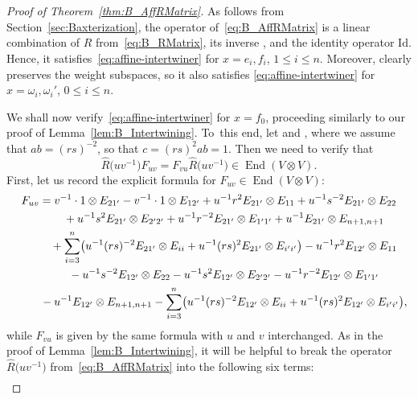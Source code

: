 \documentclass[10pt,a4paper]{amsart}
\numberwithin{equation}{section}
\DeclareMathOperator{\End}{End}
\newcommand{\Id}{\mathrm{Id}}
\begin{document}
\begin{proof}[Proof of Theorem~\ref{thm:B_AffRMatrix}]
As follows from Section~\ref{sec:Baxterization}, the operator  of~\eqref{eq:B_AffRMatrix} is a linear combination of $\hat{R}$ from~\eqref{eq:B_RMatrix}, its inverse , and the identity operator $\Id$. Hence, it satisfies~\eqref{eq:affine-intertwiner} for $x=e_i,f_i$, $1\leq i\leq n$. Moreover,  clearly preserves the weight subspaces, so it also satisfies \eqref{eq:affine-intertwiner} for $x = \omega_{i},\omega_{i}'$, $0 \le i \le n$.

We shall now verify~\eqref{eq:affine-intertwiner} for $x=f_0$, proceeding similarly to our proof of Lemma~\ref{lem:B_Intertwining}. To~this end, let  and , where we assume that $ab = (rs)^{-2}$, so that $c = (rs)^{2}ab = 1$. Then we need to verify that
\[
\hat{R}\bigl(uv^{-1}\bigr)F_{uv}= F_{vu}\hat{R}\bigl(uv^{-1}\bigr)\in \End(V \otimes V).
\]
First, let us record the explicit formula for $F_{uv}\in \End(V \otimes V)$:
\begin{gather*}
 F_{uv} = v^{-1} \cdot 1 \otimes E_{21'} - v^{-1}\cdot 1 \otimes E_{12'} + u^{-1}r^{2}E_{21'} \otimes E_{11} + u^{-1}s^{-2}E_{21'} \otimes E_{22} \\
 \hphantom{ F_{uv} =}{}
 + u^{-1}s^{2} E_{21'} \otimes E_{2'2'}+ u^{-1}r^{-2}E_{21'} \otimes E_{1'1'} + u^{-1}E_{21'} \otimes E_{n + 1,n + 1} \\
 \hphantom{ F_{uv} =}{}
+ \sum_{i = 3}^{n}\bigl(u^{-1}(rs)^{-2}E_{21'} \otimes E_{ii} + u^{-1}(rs)^{2}E_{21'} \otimes E_{i'i'}\bigr) - u^{-1}r^{2}E_{12'} \otimes E_{11} \\
 \hphantom{ F_{uv} =}{}
- u^{-1}s^{-2}E_{12'} \otimes E_{22} - u^{-1}s^{2}E_{12'} \otimes E_{2'2'} - u^{-1}r^{-2}E_{12'} \otimes E_{1'1'} \\
 \hphantom{ F_{uv} =}{}
 -u^{-1}E_{12'} \otimes E_{n+1,n+1}- \sum_{i = 3}^{n}\bigl(u^{-1}(rs)^{-2}E_{12'} \otimes E_{ii} + u^{-1}(rs)^{2}E_{12'} \otimes E_{i'i'}\bigr),
\end{gather*}
while $F_{vu}$ is given by the same formula with $u$ and $v$ interchanged. As in the proof of Lemma~\ref{lem:B_Intertwining}, it will be helpful to break the operator $\hat{R}\bigl(uv^{-1}\bigr)$ from~\eqref{eq:B_AffRMatrix} into the following six terms:
\begin{gather*}

\end{gather*}
\end{proof}
\end{document}
